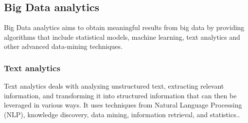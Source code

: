 \subsection{Big Data analytics}
Big Data analytics aims to obtain meaningful results from big data by providing algorithms that include statistical models, machine learning, text analytics  and other advanced data-mining techniques.
\subsubsection{Text analytics}
Text analytics deals with analyzing unstructured text, extracting relevant information, and transforming it into structured information that can then be leveraged in various ways. It uses techniques from Natural Language Processing (NLP), knowledge discovery, data mining, information retrieval, and statistics..
